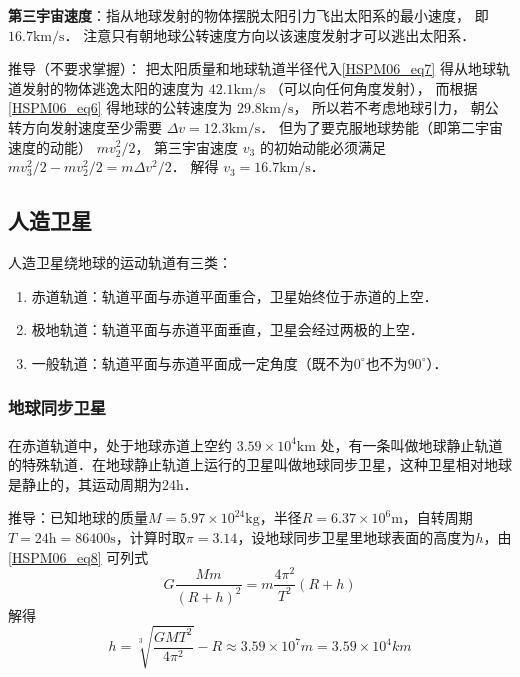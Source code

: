 \textbf{第三宇宙速度}：指从地球发射的物体摆脱太阳引力飞出太阳系的最小速度， 即 $16.7\mathrm{km/s}$． 注意只有朝地球公转速度方向以该速度发射才可以逃出太阳系．

推导（不要求掌握）： 把太阳质量和地球轨道半径代入\autoref{HSPM06_eq7} 得从地球轨道发射的物体逃逸太阳的速度为 $42.1\mathrm{km/s}$ （可以向任何角度发射）， 而根据\autoref{HSPM06_eq6} 得地球的公转速度为 $29.8\mathrm{km/s}$， 所以若不考虑地球引力， 朝公转方向发射速度至少需要 $\Delta v = 12.3\mathrm{km/s}$． 但为了要克服地球势能（即第二宇宙速度的动能） $mv_2^2/2$， 第三宇宙速度 $v_3$ 的初始动能必须满足 $mv_3^2/2 - mv_2^2/2 = m\Delta v^2/2$． 解得 $v_3 = 16.7\mathrm{km/s}$．

\subsection{人造卫星}

人造卫星绕地球的运动轨道有三类：

\begin{enumerate}
\item 赤道轨道：轨道平面与赤道平面重合，卫星始终位于赤道的上空．
\item 极地轨道：轨道平面与赤道平面垂直，卫星会经过两极的上空．
\item 一般轨道：轨道平面与赤道平面成一定角度（既不为$0^\circ$也不为$90^\circ$）．
\end{enumerate}

\subsubsection{地球同步卫星}

在赤道轨道中，处于地球赤道上空约 $3.59\times10^4\mathrm{km}$ 处，有一条叫做地球静止轨道的特殊轨道．在地球静止轨道上运行的卫星叫做地球同步卫星，这种卫星相对地球是静止的，其运动周期为$24\mathrm{h}$．

推导：已知地球的质量$M=5.97\times10^24\mathrm{kg}$，半径$R=6.37\times10^6\mathrm{m}$，自转周期$T=24\mathrm{h}=86400\mathrm{s}$，计算时取$\pi=3.14$，设地球同步卫星里地球表面的高度为$h$，由\autoref{HSPM06_eq8} 可列式
\begin{equation}
G\frac{Mm}{(R+h)^2}= m\frac{4\pi^2}{T^2}(R+h)
\end{equation}
解得
\begin{equation}
h=\sqrt[3]{\frac{GMT^2}{4\pi^2}}-R \approx 3.59\times10^7m=3.59\times10^4km
\end{equation}
